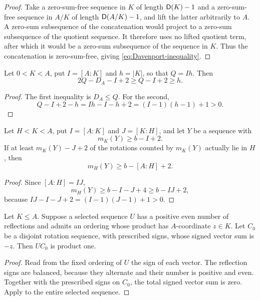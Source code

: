 \begin{proof}
Take a zero-sum-free sequence in \(K\) of length \(\mathsf D(K)-1\) and a
zero-sum-free sequence in \(A/K\) of length \(\mathsf D(A/K)-1\), and lift
the latter arbitrarily to \(A\). A zero-sum subsequence of the
concatenation would project to a zero-sum subsequence of the quotient
sequence. It therefore uses no lifted quotient term, after which it
would be a zero-sum subsequence of the sequence in \(K\). Thus the
concatenation is zero-sum-free, giving \eqref{eq:Davenport-inequality}.
\end{proof}

\begin{lemma}\label{lem:target-length}
Let \(0<K<A\), put \(I=[A:K]\) and \(h=|K|\), so that \(Q=Ih\).
Then
\begin{equation}\label{eq:target-length}
  2Q-D_A-I+2\ge Q-I+2\ge h.
\end{equation}
\end{lemma}

\begin{proof}
The first inequality is \(D_A\le Q\). For the second,
\[
  Q-I+2-h=Ih-I-h+2=(I-1)(h-1)+1>0.
\]
\end{proof}

\begin{lemma}\label{lem:concentration-transitivity}
Let \(H<K<A\), put \(I=[A:K]\) and \(J=[K:H]\), and let \(Y\) be a
sequence with
\[
  m_K(Y)\ge b-I+2.
\]
If at least \(m_K(Y)-J+2\) of the rotations counted by \(m_K(Y)\)
actually lie in \(H\), then
\[
  m_H(Y)\ge b-[A:H]+2.
\]
\end{lemma}

\begin{proof}
Since \([A:H]=IJ\),
\[
  m_H(Y)\ge b-I-J+4\ge b-IJ+2,
\]
because \(IJ-I-J+2=(I-1)(J-1)+1>0\).
\end{proof}

\begin{lemma}\label{lem:defect-correction}
Let \(K\le A\). Suppose a selected sequence \(U\) has a positive even
number of reflections and admits an ordering whose product has
\(A\)-coordinate \(z\in K\). Let \(C_0\) be a disjoint rotation
sequence, with prescribed signs, whose signed vector sum is \(-z\).
Then \(UC_0\) is product one.
\end{lemma}

\begin{proof}
Read from the fixed ordering of \(U\) the sign of each vector. The
reflection signs are balanced, because they alternate and their number
is positive and even. Together with the prescribed signs on \(C_0\),
the total signed vector sum is zero. Apply
 to the entire selected sequence.
\end{proof}

